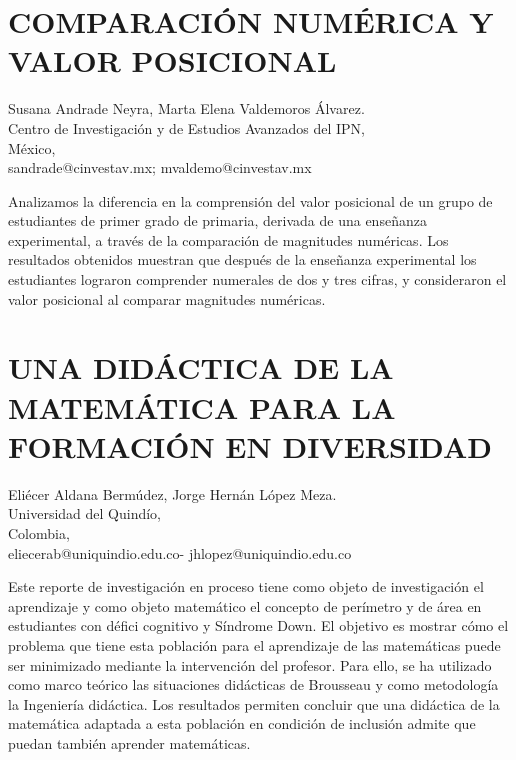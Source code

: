 \section{COMPARACIÓN NUMÉRICA Y VALOR POSICIONAL }

\begin{datos}
Susana Andrade Neyra, Marta Elena Valdemoros Álvarez.\\
Centro de Investigación y de Estudios Avanzados del IPN,\\
\hfill México, \\
\hfill sandrade@cinvestav.mx; mvaldemo@cinvestav.mx
\end{datos}

Analizamos la diferencia en la comprensión del valor posicional de
un grupo de estudiantes de primer grado de primaria, derivada de una
enseñanza experimental, a través de la comparación de magnitudes numéricas.
Los resultados obtenidos muestran que después de la enseñanza experimental
los estudiantes lograron comprender numerales de dos y tres cifras,
y consideraron el valor posicional al comparar magnitudes numéricas.


\section{UNA DIDÁCTICA DE LA MATEMÁTICA PARA LA FORMACIÓN EN DIVERSIDAD}

\begin{datos}
Eliécer Aldana Bermúdez, Jorge Hernán López Meza.\\
Universidad del Quindío,\\
\hfill Colombia, \\
\hfill eliecerab@uniquindio.edu.co- jhlopez@uniquindio.edu.co
\end{datos}

Este reporte de investigación en proceso tiene como objeto de investigación
el aprendizaje y como objeto matemático el concepto de perímetro y
de área en estudiantes con défici cognitivo y Síndrome Down. El objetivo
es mostrar cómo el problema que tiene esta población para el aprendizaje
de las matemáticas puede ser minimizado mediante la intervención del
profesor. Para ello, se ha utilizado como marco teórico las situaciones
didácticas de Brousseau y como metodología la Ingeniería didáctica.
Los resultados permiten concluir que una didáctica de la matemática
adaptada a esta población en condición de inclusión admite que puedan
también aprender matemáticas. 

\setcounter{section}{100}


